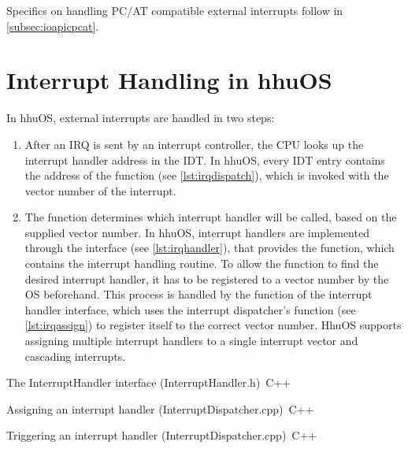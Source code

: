 Specifics on handling PC/AT compatible external interrupts follow in \autoref{subsec:ioapicpcat}.

\section{Interrupt Handling in hhuOS}
\label{sec:currenthhuos}

In hhuOS, external interrupts are handled in two steps:

\begin{enumerate}
  \item After an IRQ is sent by an interrupt controller, the CPU looks up the interrupt handler address in
        the IDT. In hhuOS, every IDT entry contains the address of the  function (see
        \autoref{lst:irqdispatch}), which is invoked with the vector number of the interrupt.
  \item The  function determines which interrupt handler will be called, based on the
        supplied vector number. In hhuOS, interrupt handlers are implemented through the
         interface (see \autoref{lst:irqhandler}), that provides the 
        function, which contains the interrupt handling routine. To allow the  function to
        find the desired interrupt handler, it has to be registered to a vector number by the OS
        beforehand. This process is handled by the  function of the interrupt handler
        interface, which uses the interrupt dispatcher's  function (see
        \autoref{lst:irqassign}) to register itself to the correct vector number. HhuOS supports assigning
        multiple interrupt handlers to a single interrupt vector and cascading interrupts.
\end{enumerate}

\begin{codeblock}[label=lst:irqhandler]{The InterruptHandler interface (InterruptHandler.h)~\cite{hhuos}}{C++}
\end{codeblock}

\begin{codeblock}[label=lst:irqassign]{Assigning an interrupt handler (InterruptDispatcher.cpp)~\cite{hhuos}}{C++}
\end{codeblock}

\begin{codeblock}[label=lst:irqdispatch]{Triggering an interrupt handler (InterruptDispatcher.cpp)~\cite{hhuos}}{C++}
\end{codeblock}

